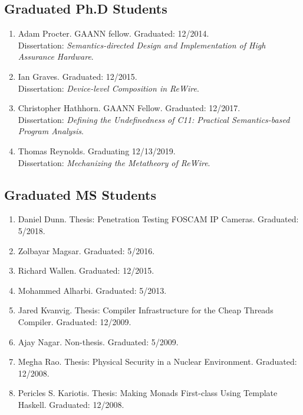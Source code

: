 \documentclass[12pt]{article} %
\begin{document}
\subsection*{Graduated Ph.D Students}

\begin{enumerate}[leftmargin=0.0mm]
\item Adam Procter. GAANN fellow. Graduated: 12/2014.\\
\newblock Dissertation: \emph{Semantics-directed Design and Implementation of High Assurance Hardware}.

\item Ian Graves. Graduated: 12/2015.\\
\newblock Dissertation: \emph{Device-level Composition in ReWire}.


\item Christopher Hathhorn. GAANN Fellow. Graduated: 12/2017.\\
\newblock Dissertation: \emph{Defining the Undefinedness of C11: Practical Semantics-based Program Analysis}.

\item Thomas Reynolds. Graduating 12/13/2019. \\
\newblock Dissertation: \emph{Mechanizing the Metatheory of ReWire}.


\end{enumerate}

\subsection*{Graduated MS Students}

\begin{enumerate}[leftmargin=0.0mm]
\item Daniel Dunn. Thesis: Penetration Testing FOSCAM IP Cameras. Graduated: 5/2018.
\item Zolbayar Magsar. Graduated: 5/2016.
\item Richard Wallen. Graduated: 12/2015.
\item Mohammed Alharbi. Graduated: 5/2013.
\item Jared Kvanvig. Thesis: Compiler Infrastructure for the Cheap Threads Compiler. Graduated: 12/2009.
\item Ajay Nagar.  Non-thesis. Graduated: 5/2009.
\item Megha Rao. Thesis: Physical Security in a Nuclear Environment. Graduated: 12/2008.
\item Pericles S. Kariotis. Thesis: Making Monads First-class Using Template Haskell. Graduated: 12/2008.
\end{enumerate}
\end{document}
